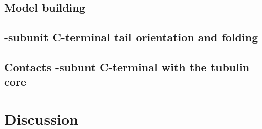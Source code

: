 \documentclass[a4paper]{article}
\begin{document}
\subsection{Model building}


\subsection{\beta-subunit C-terminal tail orientation and folding}


\subsection{Contacts \beta-subunt C-terminal with the tubulin core}


\section{Discussion}
\end{document}
